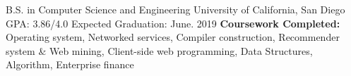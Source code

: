 

\begin{cventries}

  \cventry
    {B.S. in Computer Science and Engineering} %
    {University of California, San Diego} %
    {GPA: 3.86/4.0} %
    {Expected Graduation: June. 2019} %
    {\textbf{Coursework Completed:} Operating system, Networked services, Compiler construction, Recommender system \& Web mining, Client-side web programming, Data Structures, Algorithm, Enterprise finance}
% 
% 

\end{cventries}
